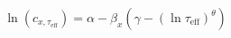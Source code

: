\documentclass{article}
\begin{document}
\LARGE
\pagestyle{empty}
\[
\ln(c_{x,\tau_\mathrm{eff}}) = \alpha-\beta_x\left(\gamma-(\ln \tau_\mathrm{eff})^\theta\right)
\]
\end{document}
